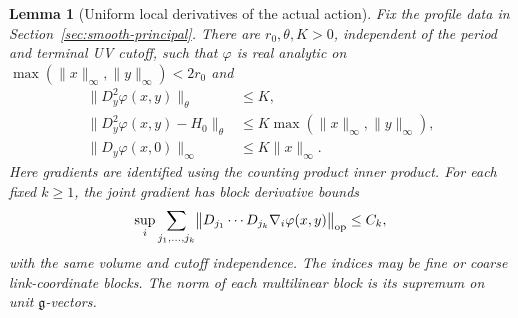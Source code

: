 \documentclass[11pt,reqno]{amsart}
\numberwithin{equation}{section}
\newtheorem{lemma}[theorem]{Lemma}
\theoremstyle{definition}
\theoremstyle{remark}
\newcommand{\g}{\mathfrak g}
\begin{document}
\begin{lemma}[Uniform local derivatives of the actual action]
\label{lem:uniform-action-derivatives}
Fix the profile data in Section~\ref{sec:smooth-principal}.
There are \(r_0,\theta,K>0\), independent of the period and
terminal UV cutoff, such that \(\varphi\) is real analytic on
\(\max(\|x\|_\infty,\|y\|_\infty)<2r_0\) and
\begin{align}
 \|D_y^2\varphi(x,y)\|_\theta&\le K,\label{eq:proved-local-hessian}\\
 \|D_y^2\varphi(x,y)-H_0\|_\theta
                    &\le K\max(\|x\|_\infty,\|y\|_\infty),
                    \label{eq:proved-hessian-perturbation}\\
 \|D_y\varphi(x,0)\|_\infty&\le K\|x\|_\infty.
                    \label{eq:proved-gradient-forcing}
\end{align}
Here gradients are identified using the counting product inner
product. For each fixed \(k\ge1\), the joint gradient has
block derivative bounds
\begin{equation}
 \sup_i\sum_{j_1,\ldots,j_k}
       \bigl\|D_{j_1}\cdots D_{j_k}\nabla_i\varphi(x,y)\bigr\|_{\rm op}
                                                            \le C_k,
 \label{eq:joint-gradient-sums}
\end{equation}
with the same volume and cutoff independence. The indices may
be fine or coarse link-coordinate blocks. The norm of each
multilinear block is its supremum on unit \(\g\)-vectors.
\end{lemma}
\end{document}
